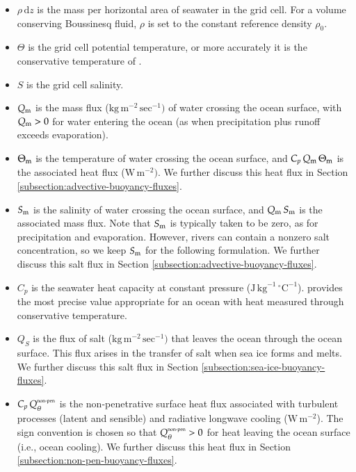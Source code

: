 \begin{itemize}

\item $\rho \, \mathrm{d}z$ is the mass per horizontal area of
  seawater in the grid cell.  For a volume conserving Boussinesq
  fluid, $\rho$ is set to the constant reference density $\rho_{0}$.

\item $\Theta$ is the grid cell potential temperature, or more
  accurately it is the conservative temperature of
  \cite{McDougall2003}.

 \item $S$ is the grid cell salinity.

 \item $Q_{\mbox{\scriptsize m}}$ is the mass flux ($\mbox{kg} \, \mbox{m}^{-2} \,
 \mbox{sec}^{-1})$ of water crossing the ocean surface, with $Q_{\mbox{\scriptsize m}} >
 0$ for water entering the ocean (as when precipitation plus runoff
 exceeds evaporation).

\item $\Theta_{\mbox{\scriptsize m}}$ is the temperature of water crossing the ocean
  surface, and $C_{p} \, Q_{\mbox{\scriptsize m}} \, \Theta_{\mbox{\scriptsize m}}$ is the associated heat flux
  ($\mbox{W} \, \mbox{m}^{-2})$.  We further discuss this heat flux in
  Section \ref{subsection:advective-buoyancy-fluxes}.

\item $S_{\mbox{\scriptsize m}}$ is the salinity of water crossing the ocean surface, and
  $Q_{\mbox{\scriptsize m}} \, S_{\mbox{\scriptsize m}}$ is the associated mass flux.  Note that $S_{\mbox{\scriptsize m}}$ is
  typically taken to be zero, as for precipitation and evaporation.
  However, rivers can contain a nonzero salt concentration, so we keep
  $S_{\mbox{\scriptsize m}}$ for the following formulation.  We further discuss this salt
  flux in Section \ref{subsection:advective-buoyancy-fluxes}.

\item $C_{p}$ is the seawater heat capacity at constant pressure
  ($\mbox{J} \, \mbox{kg}^{-1} \, \mbox{}^{\circ}\mbox{C}^{-1}$).
  \cite{TEOS2010} provides the most precise value appropriate for an
  ocean with heat measured through conservative
  temperature. \label{heat_capacity}

\item $Q_{S}$ is the flux of salt ($\mbox{kg} \, \mbox{m}^{-2} \,
  \mbox{sec}^{-1})$ that leaves the ocean through the ocean surface.
  This flux arises in the transfer of salt when sea ice forms and
  melts.  We further discuss this salt flux in Section
  \ref{subsection:sea-ice-buoyancy-fluxes}.

\item $C_{p} \, Q_{\theta}^{\mbox{\tiny non-pen}}$ is the
  non-penetrative surface heat flux associated with turbulent
  processes (latent and sensible) and radiative longwave cooling
  ($\mbox{W} \, \mbox{m}^{-2}$).  The sign convention is chosen so
  that $Q_{\theta}^{\mbox{\tiny non-pen}} > 0$ for heat leaving the
  ocean surface (i.e., ocean cooling).  We further discuss this heat
  flux in Section \ref{subsection:non-pen-buoyancy-fluxes}.


\end{itemize}
